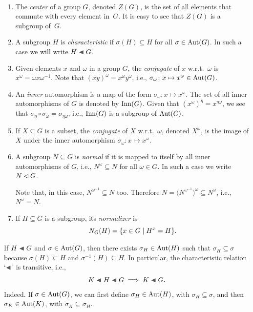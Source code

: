 \begin{defns}${}$
    \begin{enumerate}[\upshape i)]
        \item     The \textsl{center} of a group $G$, denoted $Z(G)$, is the set of all elements that commute with every element in~$G$. It is easy to see that $Z(G)$ is a subgroup of~$G$.

        \item A subgroup $H$ is \textsl{characteristic} if $\sigma(H)\subseteq H$ for all $\sigma\in{\rm Aut}(G)$. In such a case we will write $H \ch G$.
        
        \item Given elements $x$ and\/ $\omega$ in a group $G$, the \textsl{conjugate} of $x$ w.r.t.\ $\omega$ is $x^\omega=\omega x\omega^{-1}$. Note that $(xy)^\omega=x^\omega y^\omega$, i.e., $\sigma_\omega\colon x\mapsto x^\omega\in{\rm Aut}(G)$.

        \item An \textsl{inner} automorphism is a map of the form $\sigma_\omega\colon x\mapsto x^\omega$. The set of all inner automorphisms of\/ $G$ is denoted by\/ ${\rm Inn}(G)$. Given that $(x^\omega)^\eta=x^{\eta\omega}$, we see that\/ $\sigma_\eta\circ\sigma_\omega=\sigma_{\eta\omega}$, i.e., ${\rm Inn}(G)$ is a subgroup of ${\rm Aut}(G)$.

        \item If $X\subseteq G$ is a subset, the \textsl{conjugate} of\/ $X$ w.r.t.\ $\omega$, denoted $X^\omega$, is the image of\/ $X$ under the inner automorphism $\sigma_\omega\colon x\mapsto x^\omega$.

        \item A subgroup $N\subseteq G$ is \textsl{normal} if it is mapped to itself by all inner automorphisms of\/ $G$, i.e., $N^\omega\subseteq N$ for all $\omega\in G$. In such a case we write $N\lhd G$.
        
        Note that, in this case, $N^{\omega^{-1}}\subseteq N$ too. Therefore $N=\big(N^{\omega^{-1}}\big)^\omega\subseteq N^\omega$, i.e., $N^\omega=N$.

        \item If $H\subseteq G$ is a subgroup, its \textsl{normalizer} is
        $$
            N_G(H) = \{x\in G\mid H^x=H\}.
        $$
    \end{enumerate}
\end{defns}

\begin{rem}\label{characteristic-transitivity}
    If\/ $H\ch G$ and\/ $\sigma\in{\rm Aut}(G)$, then there exists\/ $\sigma_H\in{\rm Aut}(H)$ such that\/ $\sigma_H\subseteq\sigma$ because $\sigma(H)\subseteq H$ and\/ $\sigma^{-1}(H)\subseteq H$. In particular, the characteristic relation `$\ch$' is transitive, i.e.,
    $$
        K\ch H\ch G\implies K\ch G.
    $$
    \textrm{\upshape Indeed. If $\sigma\in{\rm Aut}(G)$, we can first define $\sigma_H\in{\rm Aut}(H)$, with $\sigma_H\subseteq\sigma$, and then $\sigma_K\in{\rm Aut}(K)$, with $\sigma_K\subseteq\sigma_H$.}
\end{rem}

